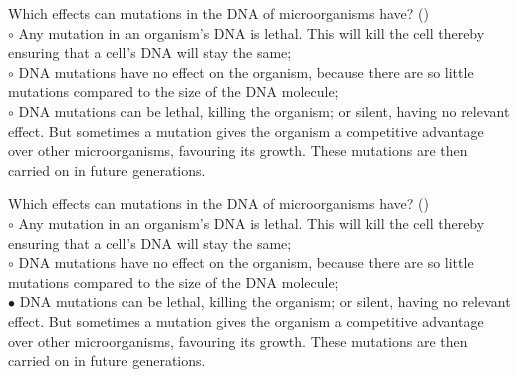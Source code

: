 \documentclass[]{beamer}
\begin{document}
\begin{frame}[shrink] {}
\addtocounter{questions}{1}
\color{blue}
Which effects can mutations in the DNA of microorganisms have? ()\\
\color{black}
\setlength{\parindent}{-0.4cm}
{\color{red}$\circ$} Any mutation in an organism's DNA is lethal. This will kill the cell
thereby ensuring that a cell’s DNA will stay the same;\\
{\color{red}$\circ$} DNA mutations have no effect on the organism, because there are
so little mutations compared to the size of the DNA molecule;\\
{\color{red}$\circ$} DNA mutations can be lethal, killing the organism; or silent, having
no relevant effect. But sometimes a mutation gives the organism a
competitive advantage over other microorganisms, favouring its
growth. These mutations are then carried on in future generations.
\end{frame}
\begin{frame}[shrink] {}
\addtocounter{answers}{1}
\color{blue}
Which effects can mutations in the DNA of microorganisms have? ()\\
\color{black}
\setlength{\parindent}{-0.4cm}
{\color{red}$\circ$} Any mutation in an organism's DNA is lethal. This will kill the cell
thereby ensuring that a cell’s DNA will stay the same;\\
{\color{red}$\circ$} DNA mutations have no effect on the organism, because there are
so little mutations compared to the size of the DNA molecule;\\
{\color{red}$\bullet$} DNA mutations can be lethal, killing the organism; or silent, having
no relevant effect. But sometimes a mutation gives the organism a
competitive advantage over other microorganisms, favouring its
growth. These mutations are then carried on in future generations.
\end{frame}
\end{document}
